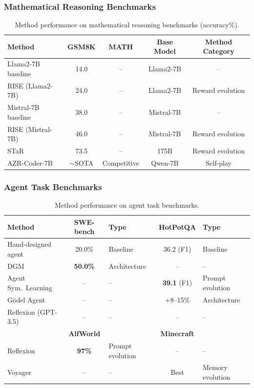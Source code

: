 \subsubsection{Mathematical Reasoning Benchmarks}

\begin{table}[htbp]
\centering
\caption{Method performance on mathematical reasoning benchmarks (accuracy\%).}
\label{tab:math-benchmark}
\begin{tabular}{lcccc}
\toprule
\textbf{Method} & \textbf{GSM8K} & \textbf{MATH} & \textbf{Base Model} & \textbf{Method Category} \\
\midrule
Llama2-7B baseline & 14.0 & -- & Llama2-7B & -- \\
RISE (Llama2-7B) & 24.0 & -- & Llama2-7B & Reward evolution \\
Mistral-7B baseline & 38.0 & -- & Mistral-7B & -- \\
RISE (Mistral-7B) & 46.0 & -- & Mistral-7B & Reward evolution \\
STaR & 73.5 & -- & 175B & Reward evolution \\
AZR-Coder-7B & $\sim$SOTA & Competitive & Qwen-7B & Self-play \\
\bottomrule
\end{tabular}
\end{table}

\subsubsection{Agent Task Benchmarks}

\begin{table}[htbp]
\centering
\caption{Method performance on agent task benchmarks.}
\label{tab:agent-benchmark}
\begin{tabular}{lclcl}
\toprule
\textbf{Method} & \textbf{SWE-bench} & \textbf{Type} & \textbf{HotPotQA} & \textbf{Type} \\
\midrule
Hand-designed agent & 20.0\% & Baseline & 36.2 (F1) & Baseline \\
DGM & \textbf{50.0\%} & Architecture & -- & -- \\
Agent Sym.\ Learning & -- & -- & \textbf{39.1} (F1) & Prompt evolution \\
G\"{o}del Agent & -- & -- & +8--15\% & Architecture \\
Reflexion (GPT-3.5) & -- & -- & -- & -- \\
\midrule
& \textbf{AlfWorld} & & \textbf{Minecraft} & \\
\midrule
Reflexion & \textbf{97\%} & Prompt evolution & -- & -- \\
Voyager & -- & -- & Best & Memory evolution \\
\bottomrule
\end{tabular}
\end{table}

